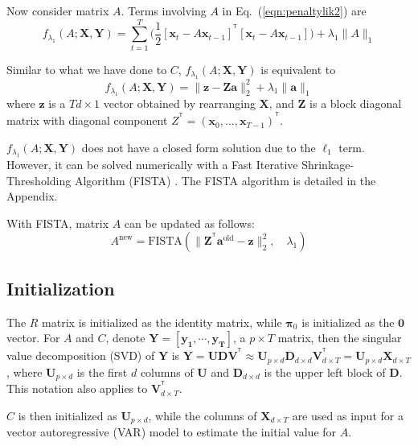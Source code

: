 \documentclass[times,twocolumn,final,authoryear]{elsarticle}
\providecommand{\mb}[1]{\boldsymbol{#1}}
\newcommand{\bx}{\mb{x}}
\newcommand{\bX}{\mb{X}}
\newcommand{\bY}{\mb{Y}}
\newcommand{\T}{^{\ensuremath{\mathsf{T}}}}           %
\let\oldref\ref
\renewcommand{\ref}[1]{(\oldref{#1})}
\begin{document}
Now consider matrix $A$. Terms involving $A$ in Eq.~\ref{eqn:penaltylik2} are
\begin{equation*}
f_{\lambda_1}(A;\bX,\bY) = \sum\limits_{t=1}^{T}\big(\frac{1}{2}[\bx_t-A\bx_{t-1}]^{\T}[\bx_t-A\bx_{t-1}]\big)+\lambda_1 \|A\|_1
\end{equation*}

Similar to what we have done to $C$, $f_{\lambda_1}(A;\bX,\bY)$ is equivalent to
\begin{equation*}
f_{\lambda_1}(A;\bX,\bY) =  \|\mathbf{z}  - \mathbf{Za}\|_2^2 + \lambda_1\|\mathbf{a}\|_1
\end{equation*}
where $\mathbf{z}$ is a $Td \times 1$ vector obtained by rearranging $\bX$, and $\mathbf{Z}$ is a block diagonal matrix with diagonal component $Z^{\T} =(\bx_0,\ldots,\bx_{T-1})^{\T}$.

$f_{\lambda_1}(A;\bX,\bY)$ does not have a closed form solution due to the $\ell_1$ term. However, it can be solved numerically with a Fast Iterative Shrinkage-Thresholding Algorithm (FISTA) \citep{beck2009fast}. The FISTA algorithm is detailed in the Appendix.

With FISTA, matrix $A$ can be updated as follows:
\begin{equation}\label{eq:updatea}
A^{\text{new}} = \text{FISTA}(\|\mathbf{Z}^{\T}\mathbf{a}^{\text{old}} -\mathbf{z}\|_2^2,\quad \lambda_1)
\end{equation}

\subsection{Initialization}\label{sec:initial}
The $R$ matrix is initialized as the identity matrix, while $\mathbf{\pi}_0$  is initialized as the $\mathbf{0}$ vector. For $A$ and $C$, denote $\bY = \left[\mathbf{y_1},\cdots,\mathbf{y_T}\right]$, a $p\times T$ matrix, then the singular value decomposition (SVD) of $\bY$ is $\bY = \mathbf{UDV^{\T}} \approx \mathbf{U}_{p \times d} \mathbf{D}_{d \times d} \mathbf{V}_{d \times T}^{\T} =\mathbf{U}_{p\times d}\bX_{d \times T}$, where $\mathbf{U}_{p \times d}$ is the first $d$ columns of $\mathbf{U}$ and $\mathbf{D}_{d\times d}$ is the upper left block of $\mathbf{D}$. This notation also applies to $\mathbf{V}^{\T}_{d \times T}$.

$C$ is then initialized as $\mathbf{U}_{p\times d}$, while the columns of $\bX_{d \times T}$ are used as input for a vector autoregressive (VAR) model to estimate the initial value for $A$.
\end{document}

